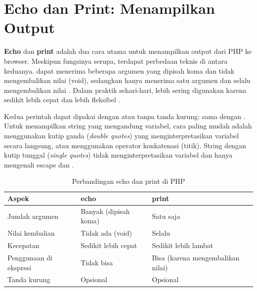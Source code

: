 \section{Echo dan Print: Menampilkan Output}

\textbf{Echo} dan \textbf{print} adalah dua cara utama untuk menampilkan output dari PHP ke browser. Meskipun fungsinya serupa, terdapat perbedaan teknis di antara keduanya.  dapat menerima beberapa argumen yang dipisah koma dan tidak mengembalikan nilai (void), sedangkan  hanya menerima satu argumen dan selalu mengembalikan nilai . Dalam praktik sehari-hari,  lebih sering digunakan karena sedikit lebih cepat dan lebih fleksibel \cite{phpManual}.

Kedua perintah dapat dipakai dengan atau tanpa tanda kurung:  sama dengan . Untuk menampilkan string yang mengandung variabel, cara paling mudah adalah menggunakan kutip ganda (\textit{double quotes}) yang menginterpretasikan variabel secara langsung, atau menggunakan operator konkatenasi (titik). String dengan kutip tunggal (\textit{single quotes}) tidak menginterpretasikan variabel dan hanya mengenali escape \code{\textbackslash\textbackslash} dan  \cite{w3schoolsPhp}.

\begin{table}[ht]
\centering
\begin{tabular}{|P{3cm}|P{4.5cm}|P{4.5cm}|}
\hline
\textbf{Aspek} & \textbf{echo} & \textbf{print} \\
\hline
Jumlah argumen & Banyak (dipisah koma) & Satu saja \\
\hline
Nilai kembalian & Tidak ada (void) & Selalu  \\
\hline
Kecepatan & Sedikit lebih cepat & Sedikit lebih lambat \\
\hline
Penggunaan di ekspresi & Tidak bisa & Bisa (karena mengembalikan nilai) \\
\hline
Tanda kurung & Opsional & Opsional \\
\hline
\end{tabular}
\caption{Perbandingan echo dan print di PHP}
\end{table}


